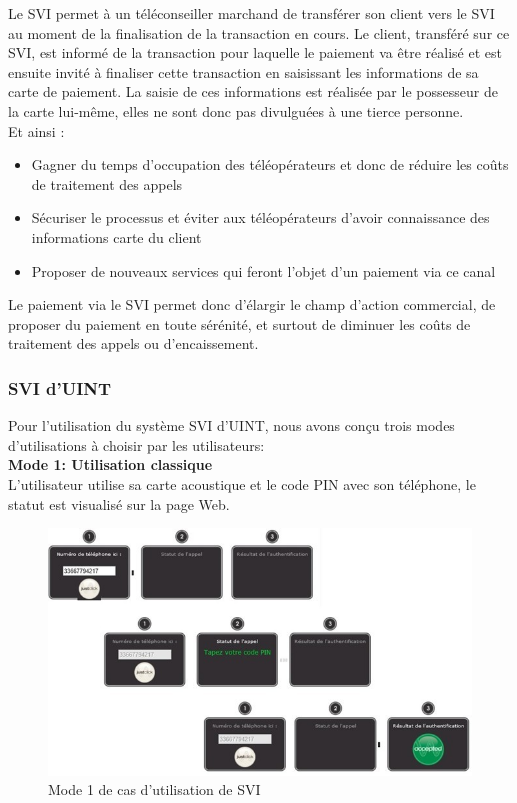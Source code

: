 Le SVI permet à un téléconseiller marchand de transférer son client vers le SVI au moment de la finalisation de la transaction en cours. Le client, transféré sur ce SVI, est informé de la transaction pour laquelle le paiement va être réalisé et est ensuite invité à finaliser cette transaction en saisissant les informations de sa carte de paiement. La saisie de ces informations est réalisée par le possesseur de la carte lui-même, elles ne sont donc pas divulguées à une tierce personne.\\

Et ainsi :
\begin{itemize}
\item Gagner du temps d’occupation des téléopérateurs et donc de réduire les coûts de traitement des appels
\item Sécuriser le processus et éviter aux téléopérateurs d’avoir connaissance des informations carte du client
\item Proposer de nouveaux services qui feront l’objet d’un paiement via ce canal\\
\end{itemize}

Le paiement via le SVI permet donc d’élargir le champ d’action commercial, de proposer du paiement en toute sérénité, et surtout de diminuer les coûts de traitement des appels ou d’encaissement. 



\subsubsection{SVI d'UINT}

Pour l'utilisation du système SVI d'UINT, nous avons conçu trois modes d'utilisations à choisir par les utilisateurs:\\

\textbf{Mode 1: Utilisation classique}\\
L'utilisateur utilise sa carte acoustique et le code PIN avec son téléphone, le statut est visualisé sur la page Web.

\begin{figure}[!htbp]
  \centering
    \includegraphics[scale=1]{images/mode1}
  \caption{Mode 1 de cas d’utilisation de SVI}
\end{figure}

